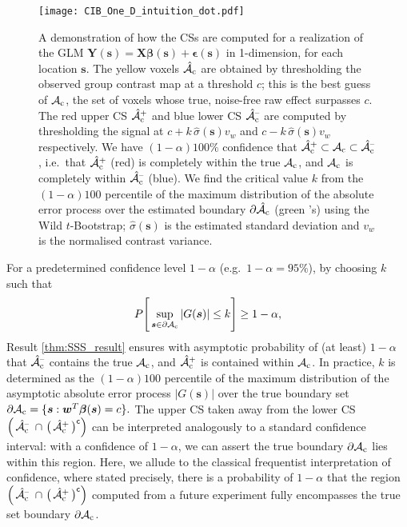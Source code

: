 \begin{figure}[htbp]
\hspace*{-1.5cm}
\label{fig:one_d_intuiton}%
\centering
    \texttt{[image: CIB\_One\_D\_intuition\_dot.pdf]}
\caption{A demonstration of how the CSs are computed for a realization of the GLM $\bm{Y}(\bm{s}) = \bm{X}\bm{\beta}(\bm{s}) + \bm{\epsilon}(\bm{s})$ in 1-dimension, for each location $\bm{s}$.
The yellow voxels $\operatorname{\hat{\mathcal{A}}_{c}}$ are obtained by thresholding the observed group contrast map at a threshold $c$; this is the best guess of $\operatorname{\mathcal{A}_{c}}$, the set of voxels whose true, noise-free raw effect surpasses $c$. 
The red upper CS $\operatorname{\hat{\mathcal{A}}_{c}^+}$ and blue lower CS $\operatorname{\hat{\mathcal{A}}_{c}^{\textrm{--}}}$ are computed by thresholding the signal at  $c + k\, \hat{\sigma}(\bm{s}) v_{w}$ and $c - k\, \hat{\sigma}(\bm{s}) v_{w}$ respectively. 
We have $(1-\alpha)100\%$ confidence that $\operatorname{\hat{\mathcal{A}}_{c}^+} \subset \operatorname{\mathcal{A}_{c}} \subset \operatorname{\hat{\mathcal{A}}_{c}^{\textrm{--}}}$, i.e.~that $\operatorname{\hat{\mathcal{A}}_{c}^+}$ (red) is completely within the true $\operatorname{\mathcal{A}_{c}}$, and $\operatorname{\mathcal{A}_{c}}$ is completely within $\operatorname{\hat{\mathcal{A}}_{c}^{\textrm{--}}}$ (blue). 
We find the critical value $k$ from the $(1-\alpha)100$ percentile of the maximum distribution of the absolute error process over the estimated boundary $\operatorname{\partial\hat{\mathcal{A}}_{c}}$ (green \newmoon's) using the Wild $t$-Bootstrap; $\hat\sigma(\bm{s})$ is the estimated standard deviation and $v_w$ is the normalised contrast variance.}
\end{figure}

For a predetermined confidence level $1 - \alpha$ (e.g.\ $1 - \alpha = 95\%$),  by choosing $k$ such that 
\begin{equation}
\label{eq:probability_statement}
P \Bigg[\sup_{\bm{s}\in\operatorname{\partial\mathcal{A}_{c}}}|G(\bm{s})|\leq k\Bigg] \geq 1-\alpha,
\end{equation}
Result \ref{thm:SSS_result} ensures with asymptotic probability of (at least) $1 - \alpha$ that $\operatorname{\hat{\mathcal{A}}_{c}^{\textrm{--}}}$ contains the true  $\operatorname{\mathcal{A}_{c}}$,  and $\operatorname{\hat{\mathcal{A}}_{c}^+}$ is contained within $\operatorname{\mathcal{A}_{c}}$. In practice,  $k$ is determined as the $(1-\alpha)100$ percentile of the maximum distribution of the asymptotic absolute error process $|G(\bm{s})|$ over the true boundary set $\operatorname{\partial\mathcal{A}_{c}} = \{\bm{s} : \bm{w}^{T}\bm{\beta}(\bm{s}) = c\}.$ The upper CS taken away from the lower CS $\Big(\Ahatcm \ \cap \ \big(\Ahatcp\big)^{\mathsf{c}}\Big)$ can be interpreted analogously to a standard confidence interval: with a confidence of $1 - \alpha$, we can assert the true boundary $\operatorname{\partial\mathcal{A}_{c}}$ lies within this region. Here, we allude to the classical frequentist interpretation of confidence, where stated precisely, there is a probability of $1 - \alpha$ that the region $\Big(\Ahatcm \ \cap \ \big(\Ahatcp\big)^{\mathsf{c}}\Big)$ computed from a future experiment fully encompasses the true set boundary $\operatorname{\partial\mathcal{A}_{c}}$.

